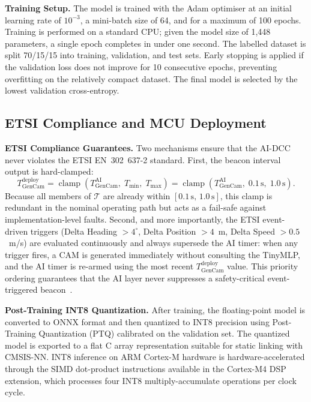 \documentclass[journal]{IEEEtran}
\begin{document}
\textbf{Training Setup.}
The model is trained with the Adam optimiser at an initial learning
rate of $10^{-3}$, a mini-batch size of 64, and for a maximum of
100 epochs.  Training is performed on a standard CPU; given the
model size of 1,448 parameters, a single epoch completes in under
one second.  The labelled dataset is split 70/15/15 into
training, validation, and test sets.  Early stopping is applied
if the validation loss does not improve for 10 consecutive epochs,
preventing overfitting on the relatively compact dataset.  The
final model is selected by the lowest validation cross-entropy.

\subsection{ETSI Compliance and MCU Deployment}
\label{subsec:4}

\textbf{ETSI Compliance Guarantees.}
Two mechanisms ensure that the AI-DCC never violates the ETSI
EN~302~637-2 standard.  First, the beacon interval output is hard-clamped:
\begin{equation}
  T_{\text{GenCam}}^{\text{deploy}}
  = \operatorname{clamp}\!\left(
      T_{\text{GenCam}}^{\mathrm{AI}},\;
      T_{\min},\; T_{\max}
    \right)
  = \operatorname{clamp}\!\left(
      T_{\text{GenCam}}^{\mathrm{AI}},\;
      0.1\,\text{s},\; 1.0\,\text{s}
    \right).
  \label{eq:clamp}
\end{equation}
Because all members of $\mathcal{T}$ are already within
$[0.1\,\text{s},\, 1.0\,\text{s}]$, this clamp is redundant in the
nominal operating path but acts as a fail-safe against
implementation-level faults.  Second, and more importantly,
the ETSI event-driven triggers (Delta Heading $> 4^{\circ}$,
Delta Position $> 4$~m, Delta Speed $> 0.5$~m/s) are evaluated
continuously and always supersede the AI timer: when any trigger
fires, a CAM is generated immediately without consulting the
TinyMLP, and the AI timer is re-armed using the most recent
$T_{\text{GenCam}}^{\text{deploy}}$ value.  This priority ordering
guarantees that the AI layer never suppresses a safety-critical
event-triggered beacon~\cite{Bhattacharyya2024,Iliopoulos2025}.

\textbf{Post-Training INT8 Quantization.}
After training, the floating-point model is converted to ONNX
format and then quantized to INT8 precision using Post-Training
Quantization (PTQ) calibrated on the validation set.  The
quantized model is exported to a flat C array representation
suitable for static linking with CMSIS-NN.  INT8 inference on
ARM Cortex-M hardware is hardware-accelerated through the SIMD
dot-product instructions available in the Cortex-M4 DSP
extension, which processes four INT8 multiply-accumulate
operations per clock cycle.
\end{document}
